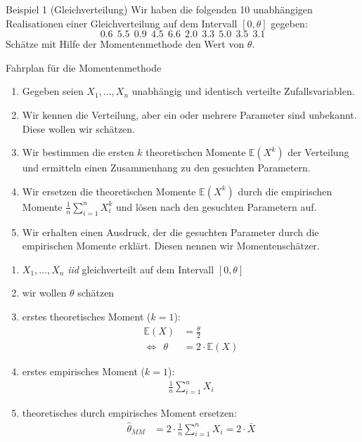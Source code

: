 \documentclass[t,11pt,aspectratio=169]{beamer}
\begin{document}
\begin{frame}
\begin{block}{Beispiel 1 (Gleichverteilung)}
	Wir haben die folgenden 10 unabhängigen Realisationen einer Gleichverteilung auf dem Intervall $[0,\theta]$ gegeben:
	$$0.6 \ \ 5.5 \ \ 0.9 \ \ 4.5 \ \ 6.6 \ \ 2.0 \ \ 3.3 \ \ 5.0 \ \ 3.5 \ \ 3.1$$
	Schätze mit Hilfe der Momentenmethode den Wert von $\theta$.
\end{block}
\end{frame}

\begin{frame}
\begin{exampleblock}{Fahrplan für die Momentenmethode}
\begin{enumerate}[<+->]
	\item Gegeben seien $X_1,\dots,X_n$ unabhängig und identisch verteilte Zufallsvariablen.
	\item Wir kennen die Verteilung, aber ein oder mehrere Parameter sind unbekannt. Diese wollen wir schätzen.
	\item Wir bestimmen die ersten $k$ theoretischen Momente $\mathbb{E}(X^k)$ der Verteilung und ermitteln einen Zusammenhang zu den gesuchten Parametern.
	\item Wir ersetzen die theoretischen Momente $\mathbb{E}(X^k)$ durch die empirischen Momente $\frac{1}{n}\sum_{i=1}^{n}X_i^k$ und lösen nach den gesuchten Parametern auf.
	\item Wir erhalten einen Ausdruck, der die gesuchten Parameter durch die empirischen Momente erklärt. Diesen nennen wir Momentenschätzer.
\end{enumerate}
\end{exampleblock}
\end{frame}

\begin{frame}
\begin{enumerate}[<+->]
\item $X_1,\dots,X_n$ \textit{iid} gleichverteilt auf dem Intervall $[0,\theta]$
\item wir wollen $\theta$ schätzen
\item erstes theoretisches Moment ($k=1$): 
\begin{align*}
\mathbb{E}(X) &= \frac{\theta}{2} \\
\Longleftrightarrow \ \ \theta &= 2\cdot \mathbb{E}(X)
\end{align*}
\item erstes empirisches Moment ($k=1$):
\begin{align*}
\frac{1}{n}\sum_{i=1}^{n}X_i
\end{align*}
\item theoretisches durch empirisches Moment ersetzen:
\begin{align*}
\hat{\theta}_{MM} &= 2\cdot\frac{1}{n}\sum_{i=1}^{n}X_i=2\cdot \bar{X}
\end{align*}

\end{enumerate}
\end{frame}
\end{document}
